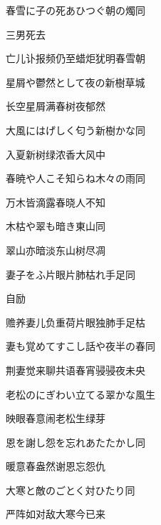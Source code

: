 \begin{haiku}
    {\FH 春雪に子の死あひつぐ朝の燭}\hfill{\FH 同}

    {\FK 三男死去}

    {\FK 亡儿讣报频仍至蜡炬犹明春雪朝}
\end{haiku}

\begin{haiku}
    {\FH 星屑や鬱然として夜の新樹}\hfill{\FH 草城}

    {\FK 长空星屑满春树夜郁然}
\end{haiku}

\begin{haiku}
    {\FH 大風にはげしく匂う新樹かな}\hfill{\FH 同}

    {\FK 入夏新树绿浓香大风中}
\end{haiku}

\begin{haiku}
    {\FH 春暁や人こそ知らね木々の雨}\hfill{\FH 同}

    {\FK 万木皆滴露春晓人不知}
\end{haiku}

\begin{haiku}
    {\FH 木枯や翠も暗き東山}\hfill{\FH 同}

    {\FK 翠山亦暗淡东山树尽凋}
\end{haiku}

\begin{haiku}
    {\FH 妻子をふ片眼片肺枯れ手足}\hfill{\FH 同}

    {\FK 自励}

    {\FK 赡养妻儿负重荷片眼独肺手足枯}
\end{haiku}

\begin{haiku}
    {\FH 妻も覚めてすこし話や夜半の春}\hfill{\FH 同}

    {\FK 荆妻觉来聊共语春宵骎骎夜未央}
\end{haiku}

\begin{haiku}
    {\FH 老松のにぎわい立てる翠かな}\hfill{\FH 風生}

    {\FK 映眼春意闹老松生绿芽}
\end{haiku}

\begin{haiku}
    {\FH 恩を謝し怨を忘れあたたかし}\hfill{\FH 同}

    {\FK 暖意春盎然谢恩忘怨仇}
\end{haiku}

\begin{haiku}
    {\FH 大寒と敵のごとく対ひたり}\hfill{\FH 同}

    {\FK 严阵如对敌大寒今已来}
\end{haiku}

